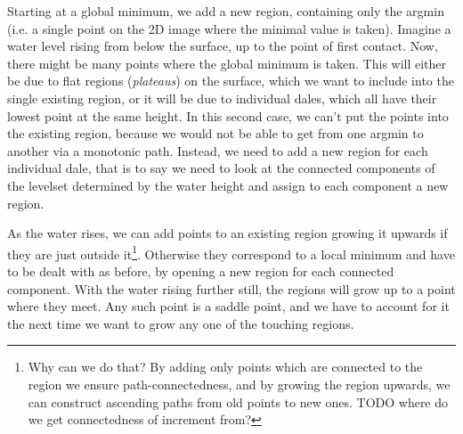 \documentclass[a4paper,12pt]{paper}
\theoremstyle{plain}
\theoremstyle{definition}
\begin{document}
Starting at a global minimum, we add a new region, containing only the argmin (i.e. a single point on the 2D image where the minimal value is taken). Imagine a water level rising from below the surface, up to the point of first contact. Now, there might be many points where the global minimum is taken. This will either be due to flat regions (\emph{plateaus}) on the surface, which we want to include into the single existing region, or it will be due to individual dales, which all have their lowest point at the same height. In this second case, we can't put the points into the existing region, because we would not be able to get from one argmin to another via a monotonic path. Instead, we need to add a new region for each individual dale, that is to say we need to look at the connected components of the levelset determined by the water height and assign to each component a new region.

As the water rises, we can add points to an existing region growing it upwards if they are just outside it\footnote{Why can we do that? By adding only points which are connected to the region we ensure path-connectedness, and by growing the region upwards, we can construct ascending paths from old points to new ones. TODO where do we get connectedness of increment from?}. Otherwise they correspond to a local minimum and have to be dealt with as before, by opening a new region for each connected component. With the water rising further still, the regions will grow up to a point where they meet. Any such point is a saddle point, and we have to account for it the next time we want to grow any one of the touching regions.
\end{document}
